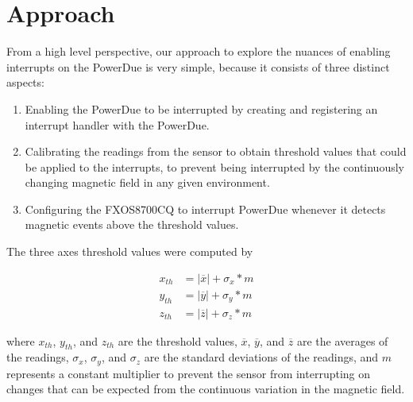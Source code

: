 \section{Approach}
\label{sec:approach}
From a high level perspective, our approach to explore the nuances of enabling
interrupts on the PowerDue is very simple, because it consists of three distinct
aspects:

\begin{enumerate}
\item Enabling the PowerDue to be interrupted by creating and registering an
      interrupt handler with the PowerDue.
\item Calibrating the readings from the sensor to obtain threshold values that
      could be applied to the interrupts, to prevent being interrupted by the
      continuously changing magnetic field in any given environment.
\item Configuring the FXOS8700CQ to interrupt PowerDue whenever it detects
      magnetic events above the threshold values.
\end{enumerate}

The three axes threshold values were computed by

\begin{align}
    x_{th} &= \lvert \overline{x} \rvert + \sigma_{x} * m \\
    y_{th} &= \lvert \overline{y} \rvert + \sigma_{y} * m \\
    z_{th} &= \lvert \overline{z} \rvert + \sigma_{z} * m
\end{align}

where $x_{th}$, $y_{th}$, and $z_{th}$ are the threshold values, $\overline{x}$,
$\overline{y}$, and $\overline{z}$ are the averages of the readings,
$\sigma_{x}$, $\sigma_{y}$, and $\sigma_{z}$ are the standard deviations of the
readings, and $m$ represents a constant multiplier to prevent the sensor from
interrupting on changes that can be expected from the continuous variation in
the magnetic field.
